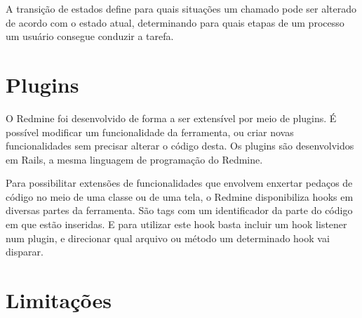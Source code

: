 A transição de estados define para quais situações um chamado pode ser alterado de acordo com o estado atual, determinando para quais etapas de um processo um usuário consegue conduzir a tarefa.

\section{Plugins}\label{sec:redmine-plugins}
O Redmine foi desenvolvido de forma a ser extensível por meio de plugins. É possível modificar um funcionalidade da ferramenta, ou criar novas funcionalidades sem precisar alterar o código desta. Os plugins são desenvolvidos em Rails, a mesma linguagem de programação do Redmine. 

Para possibilitar extensões de funcionalidades que envolvem enxertar pedaços de código no meio de uma classe ou de uma tela, o Redmine disponibiliza hooks em diversas partes da ferramenta. São tags com um identificador da parte do código em que estão inseridas. E para utilizar este hook basta incluir um hook listener num plugin, e direcionar qual arquivo ou método um determinado hook vai disparar.

\section{Limitações}\label{sec:redmine-limitacoes}

